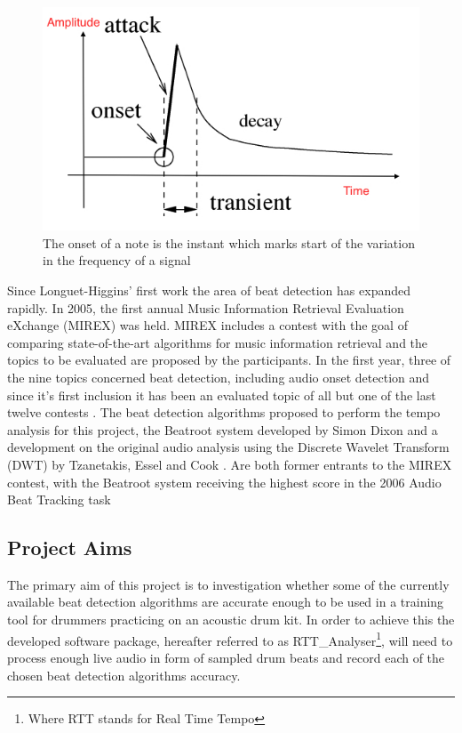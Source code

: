 \documentclass[a4paper, 11pt]{article}
\begin{document}
\begin{figure}[ht]
	\centering
	\includegraphics[scale=0.40]{Onset}
	\caption{The onset of a note is the instant which marks start of the variation in the frequency of a signal \cite{onset-tut}}
	\label{fig: Onset}
\end{figure}

Since Longuet-Higgins' first work the area of beat detection has expanded rapidly. In 2005, the first annual Music Information Retrieval Evaluation eXchange (MIREX) was held. MIREX includes a contest with the goal of comparing state-of-the-art algorithms for music information retrieval \cite{mirex-main} and the topics to be evaluated are proposed by the participants. In the first year, three of the nine topics concerned beat detection, including audio onset detection and since it's first inclusion it has been an evaluated topic of all but one of the last twelve contests \cite{mirex-onset}. The beat detection algorithms proposed to perform the tempo analysis for this project, the Beatroot system developed by Simon Dixon \cite{dixon1} and a development on the original audio analysis using the Discrete Wavelet Transform (DWT) by Tzanetakis, Essel and Cook \cite{tzane1}. Are both former entrants to the MIREX contest, with the Beatroot system receiving the highest score in the 2006 Audio Beat Tracking task \cite{mirex-06} 

\subsection{Project Aims}
The primary aim of this project is to investigation whether some of the currently available beat detection algorithms are accurate enough to be used in a training tool for drummers practicing on an acoustic drum kit. In order to achieve this the developed software package, hereafter referred to as  RTT\_Analyser\footnote{Where RTT stands for Real Time Tempo}, will need to process enough live audio in form of sampled drum beats and record each of the chosen beat detection algorithms accuracy. 
\end{document}

